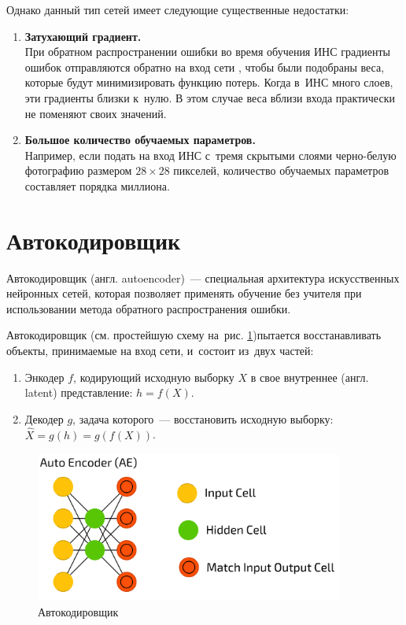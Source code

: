 Однако данный тип сетей имеет следующие существенные недостатки:
\begin{enumerate}
	\item \textbf{Затухающий градиент.}\\
	При обратном распространении ошибки во время обучения ИНС
	градиенты ошибок отправляются обратно на вход сети \cite{nn_problems}, чтобы были подобраны веса, которые будут 
	минимизировать функцию потерь. Когда в~ИНС много слоев, эти градиенты близки к~нулю. 
	В этом случае веса вблизи входа практически не поменяют своих значений.
	
	\item \textbf{Большое количество обучаемых параметров.}\\
	Например, если подать на вход ИНС с~тремя скрытыми слоями черно-белую фотографию
	размером $ 28\times28 $ пикселей, количество обучаемых параметров составляет порядка миллиона.
\end{enumerate}

\section{Автокодировщик}\label{autoencoder}

Автокодировщик (англ. autoencoder)~--- специальная архитектура искусственных нейронных сетей, 
которая позволяет применять обучение без учителя \cite{no_teacher} при использовании метода 
обратного распространения ошибки.

Автокодировщик (см. простейшую схему на~рис. \ref{ae})\linebreak пытается восстанавливать объекты, принимаемые на вход сети, и~состоит из~двух частей:

\begin{enumerate}[wide]
	\item Энкодер $ f $, кодирующий исходную выборку $ X $ в свое 
	внутреннее (англ. latent) представление: $ h=f(X) $.
	
	\item Декодер $ g $, задача которого~--- восстановить исходную выборку: $ \hat{X} = g(h) = g(f(X)) $.
\end{enumerate}

\begin{figure}[!h]
	\centering
	\includegraphics[width=0.9\textwidth]{pics/AE}
	\caption{Автокодировщик}
	\label{ae}
\end{figure}

